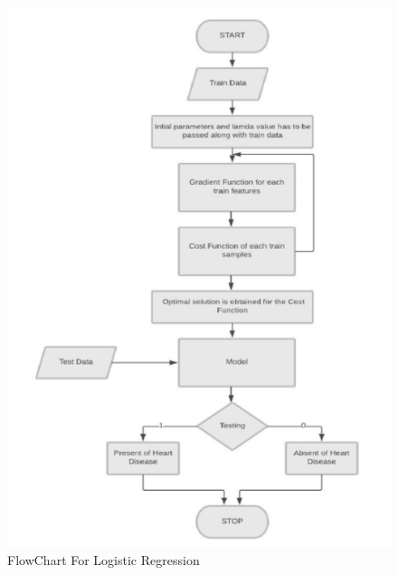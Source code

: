 \documentclass[oneside,12pt]{Classes/VTU}
\begin{document}
    		
    	\begin{figure}
    		\begin{center}
    			\includegraphics[width=14cm]{images/logistic_regression.png}
    			\caption{FlowChart For Logistic Regression}
    		\end{center}
    	\end{figure}
    	
\end{document}
